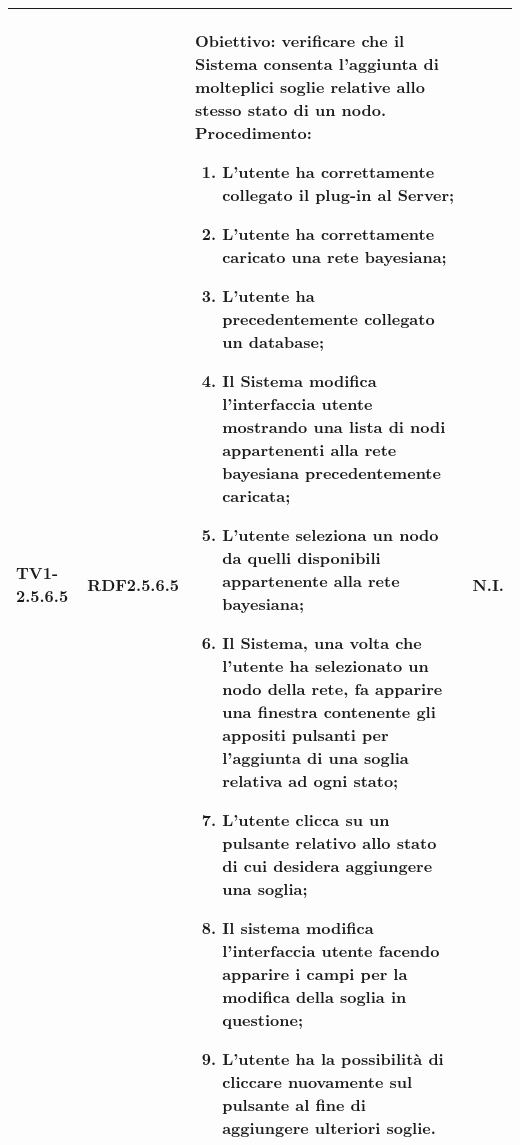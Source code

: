 \begin{longtable}{|C{.15\textwidth}|C{.13\textwidth}|m{.65\textwidth}|C{.08\textwidth}|}
TV1-2.5.6.5 & RDF2.5.6.5  &
	\textbf{Obiettivo}: verificare che il Sistema consenta l'aggiunta di molteplici soglie relative allo stesso stato di un nodo. \newline
	\textbf{Procedimento}:
	\begin{enumerate}
		\item L'utente ha correttamente collegato il plug-in al Server;
		\item L'utente ha correttamente caricato una rete bayesiana;
		\item L'utente ha precedentemente collegato un database;
		\item Il Sistema modifica l'interfaccia utente mostrando una lista di nodi appartenenti alla rete bayesiana precedentemente caricata;
		\item L'utente seleziona un nodo da quelli disponibili appartenente alla rete bayesiana;
		\item Il Sistema, una volta che l'utente ha selezionato un nodo della rete, fa apparire una finestra contenente gli appositi pulsanti per l'aggiunta di una soglia relativa ad ogni stato;
		\item L'utente clicca su un pulsante relativo allo stato di cui desidera aggiungere una soglia;
		\item Il sistema modifica l'interfaccia utente facendo apparire i campi per la modifica della soglia in questione;
		\item L'utente ha la possibilità di cliccare nuovamente sul pulsante al fine di aggiungere ulteriori soglie.
	\end{enumerate}
	& N.I. \\
\hline


\end{longtable}
